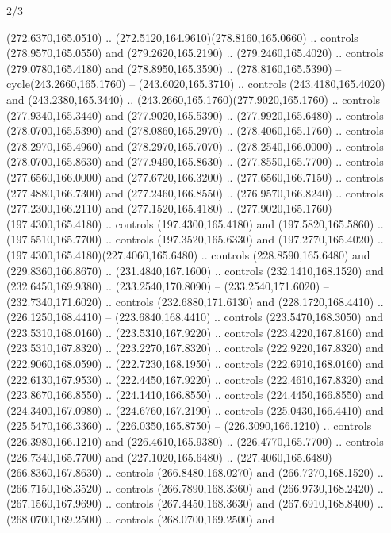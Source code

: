 \begin{flagdescription}{2/3}
\begin{scope}[xshift=0.5\flaglength,yshift=0.5\flagwidth,scale=\flagwidth/259.2]
\begin{scope}[y=0.8pt, x=0.8pt, yscale=-1,shift={(-243,-162)}]
      (272.6370,165.0510) .. (272.5120,164.9610)(278.8160,165.0660) .. controls
      (278.9570,165.0550) and (279.2620,165.2190) .. (279.2460,165.4020) .. controls
      (279.0780,165.4180) and (278.8950,165.3590) .. (278.8160,165.5390) --
      cycle(243.2660,165.1760) -- (243.6020,165.3710) .. controls
      (243.4180,165.4020) and (243.2380,165.3440) ..
      (243.2660,165.1760)(277.9020,165.1760) .. controls (277.9340,165.3440) and
      (277.9020,165.5390) .. (277.9920,165.6480) .. controls (278.0700,165.5390) and
      (278.0860,165.2970) .. (278.4060,165.1760) .. controls (278.2970,165.4960) and
      (278.2970,165.7070) .. (278.2540,166.0000) .. controls (278.0700,165.8630) and
      (277.9490,165.8630) .. (277.8550,165.7700) .. controls (277.6560,166.0000) and
      (277.6720,166.3200) .. (277.6560,166.7150) .. controls (277.4880,166.7300) and
      (277.2460,166.8550) .. (276.9570,166.8240) .. controls (277.2300,166.2110) and
      (277.1520,165.4180) .. (277.9020,165.1760)(197.4300,165.4180) .. controls
      (197.4300,165.4180) and (197.5820,165.5860) .. (197.5510,165.7700) .. controls
      (197.3520,165.6330) and (197.2770,165.4020) ..
      (197.4300,165.4180)(227.4060,165.6480) .. controls (228.8590,165.6480) and
      (229.8360,166.8670) .. (231.4840,167.1600) .. controls (232.1410,168.1520) and
      (232.6450,169.9380) .. (233.2540,170.8090) -- (233.2540,171.6020) --
      (232.7340,171.6020) .. controls (232.6880,171.6130) and (228.1720,168.4410) ..
      (226.1250,168.4410) -- (223.6840,168.4410) .. controls (223.5470,168.3050) and
      (223.5310,168.0160) .. (223.5310,167.9220) .. controls (223.4220,167.8160) and
      (223.5310,167.8320) .. (223.2270,167.8320) .. controls (222.9220,167.8320) and
      (222.9060,168.0590) .. (222.7230,168.1950) .. controls (222.6910,168.0160) and
      (222.6130,167.9530) .. (222.4450,167.9220) .. controls (222.4610,167.8320) and
      (223.8670,166.8550) .. (224.1410,166.8550) .. controls (224.4450,166.8550) and
      (224.3400,167.0980) .. (224.6760,167.2190) .. controls (225.0430,166.4410) and
      (225.5470,166.3360) .. (226.0350,165.8750) -- (226.3090,166.1210) .. controls
      (226.3980,166.1210) and (226.4610,165.9380) .. (226.4770,165.7700) .. controls
      (226.7340,165.7700) and (227.1020,165.6480) ..
      (227.4060,165.6480)(266.8360,167.8630) .. controls (266.8480,168.0270) and
      (266.7270,168.1520) .. (266.7150,168.3520) .. controls (266.7890,168.3360) and
      (266.9730,168.2420) .. (267.1560,167.9690) .. controls (267.4450,168.3630) and
      (267.6910,168.8400) .. (268.0700,169.2500) .. controls (268.0700,169.2500) and

\end{scope}
\end{scope}
\end{flagdescription}
